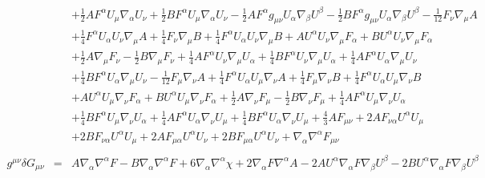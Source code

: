 \documentclass[10pt,letterpaper]{article}
\numberwithin{equation}{section}
\begin{document}
\begin{eqnarray}
&& + \tfrac{1}{2} A F^{\alpha } U_{\mu } \nabla_{\alpha }U_{\nu } + \tfrac{1}{2} B F^{\alpha } U_{\mu } \nabla_{\alpha }U_{\nu } -  \tfrac{1}{2} A F^{\alpha } g_{\mu \nu } U_{\alpha } \nabla_{\beta }U^{\beta } -  \tfrac{1}{2} B F^{\alpha } g_{\mu \nu } U_{\alpha } \nabla_{\beta }U^{\beta } -  \tfrac{1}{12} F_{\nu } \nabla_{\mu }A \nonumber \\ 
&& + \tfrac{1}{4} F^{\alpha } U_{\alpha } U_{\nu } \nabla_{\mu }A + \tfrac{1}{4} F_{\nu } \nabla_{\mu }B + \tfrac{1}{4} F^{\alpha } U_{\alpha } U_{\nu } \nabla_{\mu }B + A U^{\alpha } U_{\nu } \nabla_{\mu }F_{\alpha } + B U^{\alpha } U_{\nu } \nabla_{\mu }F_{\alpha } \nonumber \\ 
&& + \tfrac{1}{2} A \nabla_{\mu }F_{\nu } -  \tfrac{1}{2} B \nabla_{\mu }F_{\nu } + \tfrac{1}{4} A F^{\alpha } U_{\nu } \nabla_{\mu }U_{\alpha } + \tfrac{1}{4} B F^{\alpha } U_{\nu } \nabla_{\mu }U_{\alpha } + \tfrac{1}{4} A F^{\alpha } U_{\alpha } \nabla_{\mu }U_{\nu } \nonumber \\ 
&& + \tfrac{1}{4} B F^{\alpha } U_{\alpha } \nabla_{\mu }U_{\nu } -  \tfrac{1}{12} F_{\mu } \nabla_{\nu }A + \tfrac{1}{4} F^{\alpha } U_{\alpha } U_{\mu } \nabla_{\nu }A + \tfrac{1}{4} F_{\mu } \nabla_{\nu }B + \tfrac{1}{4} F^{\alpha } U_{\alpha } U_{\mu } \nabla_{\nu }B \nonumber \\ 
&& + A U^{\alpha } U_{\mu } \nabla_{\nu }F_{\alpha } + B U^{\alpha } U_{\mu } \nabla_{\nu }F_{\alpha } + \tfrac{1}{2} A \nabla_{\nu }F_{\mu } -  \tfrac{1}{2} B \nabla_{\nu }F_{\mu } + \tfrac{1}{4} A F^{\alpha } U_{\mu } \nabla_{\nu }U_{\alpha } \nonumber \\ 
&& + \tfrac{1}{4} B F^{\alpha } U_{\mu } \nabla_{\nu }U_{\alpha } + \tfrac{1}{4} A F^{\alpha } U_{\alpha } \nabla_{\nu }U_{\mu } + \tfrac{1}{4} B F^{\alpha } U_{\alpha } \nabla_{\nu }U_{\mu }+\tfrac{4}{3} A F_{\mu \nu } + 2 A F_{\nu \alpha } U^{\alpha } U_{\mu } \nonumber \\ 
&& + 2 B F_{\nu \alpha } U^{\alpha } U_{\mu } + 2 A F_{\mu \alpha } U^{\alpha } U_{\nu } + 2 B F_{\mu \alpha } U^{\alpha } U_{\nu } + \nabla_{\alpha }\nabla^{\alpha }F_{\mu \nu }
\\  \nonumber\\ 
g^{\mu\nu}\delta G_{\mu\nu}&=& A \nabla_{\alpha }\nabla^{\alpha }F -  B \nabla_{\alpha }\nabla^{\alpha }F + 6 \nabla_{\alpha }\nabla^{\alpha }\chi + 2 \nabla_{\alpha }F \nabla^{\alpha }A - 2 A U^{\alpha } \nabla_{\alpha }F \nabla_{\beta }U^{\beta } - 2 B U^{\alpha } \nabla_{\alpha }F \nabla_{\beta }U^{\beta } \nonumber \\ 

\end{eqnarray}
\end{document}
